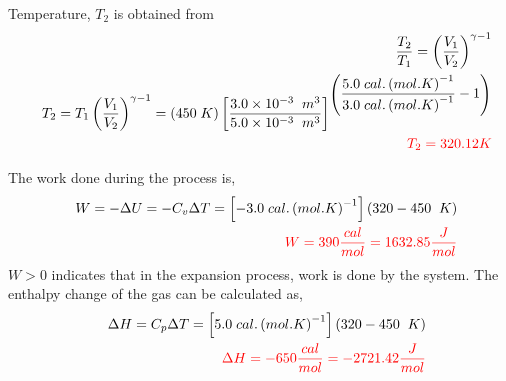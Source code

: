 \documentclass[12pts,a4paper,amsmath,amssymb,floatfix]{article}%
\newcommand{\frc}{\displaystyle\frac}
\begin{document}
\begin{enumerate}[label=\bfseries Example \arabic*:]
Temperature, $T_{2}$ is obtained from 
\begin{eqnarray}
&& \frc{T_{2}}{T_{1}} = \left(\frc{V_{1}}{V_{2}}\right)^{\gamma - 1} \nonumber \\
&& T_{2} = T_{1} \left(\frc{V_{1}}{V_{2}}\right)^{\gamma - 1 } = (450\;K)\left[\frac{3.0\times 10^{-3}\;\;m^{3}}{5.0\times 10^{-3}\;\;m^{3}}\right]^{\left(\frc{5.0\;cal.\left(mol.K\right)^{-1} }{3.0\; cal.\left(mol.K\right)^{-1}  }-1\right)} \nonumber \\
&& \textcolor{red}{T_{2} = 320.12 K} \nonumber
\end{eqnarray}

The work done during the process is,
\begin{eqnarray}
&& W = -\Delta U = - C_{v}\Delta T = \left[ -3.0\; cal.\left(mol.K\right)^{-1} \right] \left( 320 - 450 \;\;K\right) \nonumber \\
&& \textcolor{red}{W = 390 \frc{cal}{mol} = 1632.85 \frc{J}{mol}} \nonumber
\end{eqnarray}
$W>0$ indicates that in the expansion process, work is done by the system. The enthalpy change of the gas can be calculated as,
\begin{eqnarray}
&& \Delta H = C_{p}\Delta T = \left[ 5.0\; cal.\left(mol.K\right)^{-1} \right] \left( 320 - 450 \;\;K\right) \nonumber \\
&& \textcolor{red}{\Delta H = -650 \frc{cal}{mol} = -2721.42 \frc{J}{mol}} \nonumber 
\end{eqnarray}

\end{enumerate}

\clearpage
\end{document}
